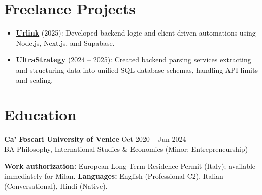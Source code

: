 \documentclass[a4paper,10pt]{article}
\begin{document}
\section{Freelance Projects}
\begin{itemize}
 \item \textbf{\href{https://smarturlink.com/}{Urlink}} (2025): Developed backend logic and client-driven automations using Node.js, Next.js, and Supabase.
 \item \textbf{\href{https://ultrastrategy.com}{UltraStrategy}} (2024 -- 2025): Created backend parsing services extracting and structuring data into unified SQL database schemas, handling API limits and scaling.
\end{itemize}

\section{Education}
\textbf{Ca' Foscari University of Venice} \hfill Oct 2020 -- Jun 2024\\
BA Philosophy, International Studies \& Economics (Minor: Entrepreneurship)

\vspace{2pt}
{\small \textbf{Work authorization:} European Long Term Residence Permit (Italy); available immediately for Milan. \quad \textbf{Languages:} English (Professional C2), Italian (Conversational), Hindi (Native).}
\end{document}
